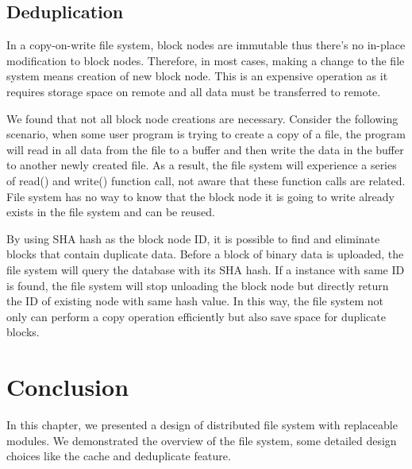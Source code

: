 \subsection{Deduplication}

    In a copy-on-write file system, block nodes are immutable thus there's no in-place modification to block nodes. Therefore, in most cases, making a change to the file system means creation of new block node. This is an expensive operation as it requires storage space on remote and all data must be transferred to remote.
    
    We found that not all block node creations are necessary. Consider the following scenario, when some user program is trying to create a copy of a file, the program will read in all data from the file to a buffer and then write the data in the buffer to another newly created file. As a result, the file system will experience a series of read() and write() function call, not aware that these function calls are related. File system has no way to know that the block node it is going to write already exists in the file system and can be reused.

    By using SHA hash as the block node ID, it is possible to find and eliminate blocks that contain duplicate data. Before a block of binary data is uploaded, the file system will query the database with its SHA hash. If a instance with same ID is found, the file system will stop unloading the block node but directly return the ID of existing node with same hash value. In this way, the file system not only can perform a copy operation efficiently but also save space for duplicate blocks. 

\section{Conclusion}

    In this chapter, we presented a design of distributed file system with replaceable modules. We demonstrated the overview of the file system, some detailed design choices like the cache and deduplicate feature.

